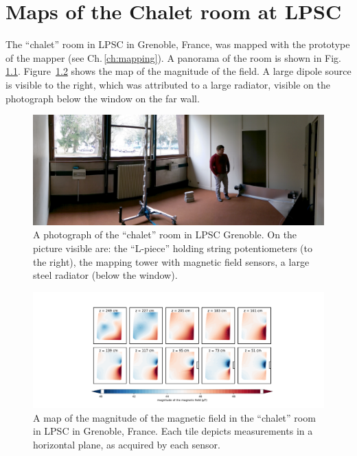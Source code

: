 \chapter{Maps of the Chalet room at LPSC}
\label{ch:chalet_appendix}
The ``chalet'' room in LPSC in Grenoble, France, was mapped with the prototype of the mapper (see Ch.\,\ref{ch:mapping}). A panorama of the room is shown in Fig.\,\ref{fig:mapping_lpsc_chalet}. Figure~\ref{fig:mapping_lpsc_chalet_magnitude_map} shows the map of the magnitude of the field. A large dipole source is visible to the right, which was attributed to a large radiator, visible on the photograph below the window on the far wall.

\begin{figure}
  \centering
  \includegraphics[width=\linewidth]{gfx/mapping/lpsc/chalet_panorama.jpg}
  \caption{A photograph of the ``chalet'' room in LPSC Grenoble. On the picture visible are: the ``L-piece'' holding string potentiometers (to the right), the mapping tower with magnetic field sensors, a large steel radiator (below the window).}\label{fig:mapping_lpsc_chalet}
\end{figure}

\begin{figure}
  \centering
  \includegraphics[width=\linewidth]{gfx/mapping/lpsc/chalet.pdf}
  \caption{A map of the magnitude of the magnetic field in the ``chalet'' room in LPSC in Grenoble, France. Each tile depicts measurements in a horizontal plane, as acquired by each sensor.}\label{fig:mapping_lpsc_chalet_magnitude_map}
\end{figure}
